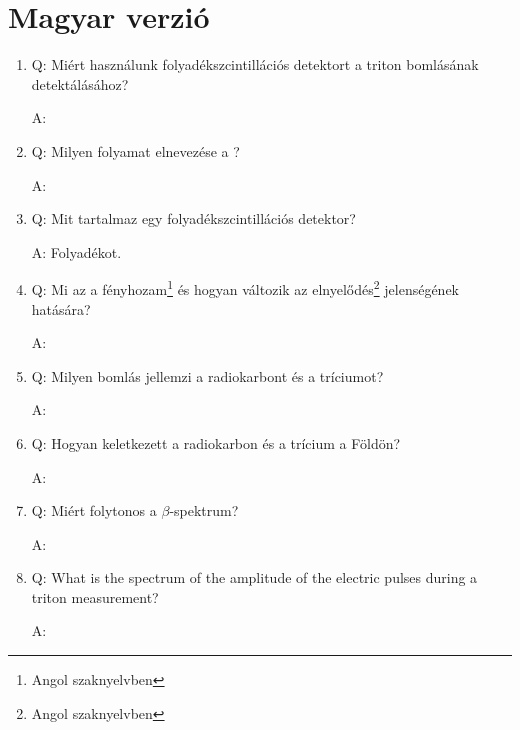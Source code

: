 \section{Magyar verzió}
\begin{enumerate}
    \item Q: Miért használunk folyadékszcintillációs detektort a triton bomlásának detektálásához?
    \begin{displayquote}
        A: 
    \end{displayquote}
    
    \item Q: Milyen folyamat elnevezése a ?
    \begin{displayquote}
        A: 
    \end{displayquote}
    
    \item Q: Mit tartalmaz egy folyadékszcintillációs detektor?
    \begin{displayquote}
        A: Folyadékot.
    \end{displayquote}
    
    \item Q: Mi az a fényhozam\footnote{Angol szaknyelvben } és hogyan változik az elnyelődés\footnote{Angol szaknyelvben } jelenségének hatására?
    \begin{displayquote}
        A: 
    \end{displayquote}
    
    \item Q: Milyen bomlás jellemzi a radiokarbont és a tríciumot?
    \begin{displayquote}
        A: 
    \end{displayquote}
    
    \item Q: Hogyan keletkezett a radiokarbon és a trícium a Földön?
    \begin{displayquote}
        A: 
    \end{displayquote}
    
    \item Q: Miért folytonos a $\beta$-spektrum?
    \begin{displayquote}
        A: 
    \end{displayquote}
    
    \item Q: What is the spectrum of the amplitude of the electric pulses during a triton
measurement?
    \begin{displayquote}
        A: 
    \end{displayquote}
    

\end{enumerate}
